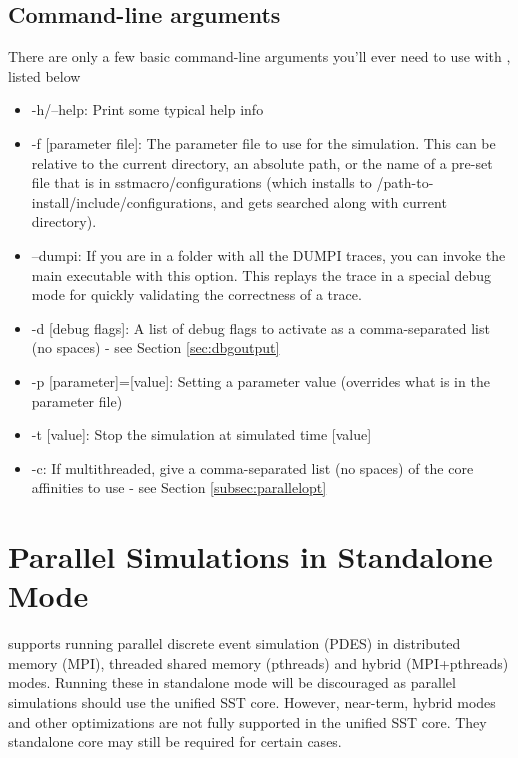 \subsection{Command-line arguments}
\label{subsec:tutorial:cmdline}

There are only a few basic command-line arguments you'll ever need to use with \sstmacro, listed below

\begin{itemize}
\item -h/--help: Print some typical help info
\item -f [parameter file]: The parameter file to use for the simulation.  
This can be relative to the current directory, an absolute path, or the name of a pre-set file that is in sstmacro/configurations 
(which installs to /path-to-install/include/configurations, and gets searched along with current directory). 
\item --dumpi: If you are in a folder with all the DUMPI traces, you can invoke the main  executable with this option.  This replays the trace in a special debug mode for quickly validating the correctness of a trace.
\item -d [debug flags]: A list of debug flags to activate as a comma-separated list (no spaces) - see Section \ref{sec:dbgoutput}
\item -p [parameter]=[value]: Setting a parameter value (overrides what is in the parameter file)
\item -t [value]: Stop the simulation at simulated time [value]
\item -c: If multithreaded, give a comma-separated list (no spaces) of the core affinities to use - see Section \ref{subsec:parallelopt}
\end{itemize}

\section{Parallel Simulations in Standalone Mode}
\label{sec:PDES}

\sstmacro supports running parallel discrete event simulation (PDES) in distributed memory (MPI), threaded shared memory (pthreads) and hybrid (MPI+pthreads) modes.  Running these in standalone mode will be discouraged as parallel simulations should use the unified SST core. However, near-term, hybrid modes and other optimizations are not fully supported in the unified SST core. They standalone core may still be required for certain cases.

